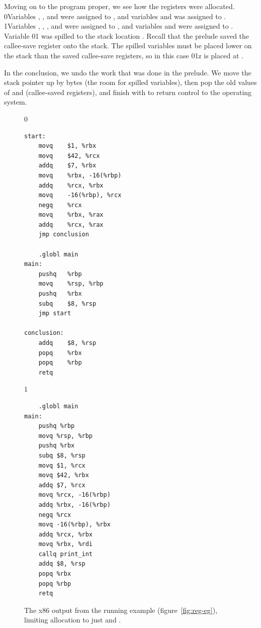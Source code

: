 \documentclass[7x10]{TimesAPriori_MIT}%
\def\racketEd{0}
\def\pythonEd{1}
\def\edition{1}
\newcommand{\racket}[1]{{\if\edition\racketEd{#1}\fi}}
\newcommand{\pythonColor}[0]{}
\newcommand{\python}[1]{{\if\edition\pythonEd\pythonColor #1\fi}}
\numberwithin{theorem}{chapter}
\numberwithin{definition}{chapter}
\numberwithin{equation}{chapter}
\begin{document}
Moving on to the program proper, we see how the registers were
allocated.
%
\racket{Variables , , and  were assigned to
  \code{rbx}, and variables  and \code{t} was assigned to .}
%
\python{Variables , , , and \code{tmp\_0}
  were assigned to \code{rcx}, and variables \code{w} and \code{tmp\_1}
  were assigned to \code{rbx}.}
%
Variable \racket{}\python{} was spilled to the stack
location .  Recall that the prelude saved the
callee-save register  onto the stack. The spilled variables
must be placed lower on the stack than the saved callee-save
registers, so in this case \racket{}\python{z} is placed at
.

In the conclusion, we undo the work that was
done in the prelude. We move the stack pointer up by  bytes
(the room for spilled variables), then pop the old values of
 and  (callee-saved registers), and finish with
 to return control to the operating system.

  
\begin{figure}[tbp]
\begin{minipage}{0.55\textwidth}
\begin{tcolorbox}[colback=white]
{\if\edition\racketEd
\begin{lstlisting}
start:
	movq	$1, %rbx
	movq	$42, %rcx
	addq	$7, %rbx
	movq	%rbx, -16(%rbp)
	addq	%rcx, %rbx
	movq	-16(%rbp), %rcx
	negq	%rcx
	movq	%rbx, %rax
	addq	%rcx, %rax
	jmp conclusion

	.globl main
main:
	pushq	%rbp
	movq	%rsp, %rbp
	pushq	%rbx
	subq	$8, %rsp
	jmp start
        
conclusion:
	addq	$8, %rsp
	popq	%rbx
	popq	%rbp
	retq
\end{lstlisting}
\fi}
{\if\edition\pythonEd\pythonColor
\begin{lstlisting}
	.globl main
main:
	pushq %rbp
	movq %rsp, %rbp
	pushq %rbx
	subq $8, %rsp
	movq $1, %rcx
	movq $42, %rbx
	addq $7, %rcx
	movq %rcx, -16(%rbp)
	addq %rbx, -16(%rbp)
	negq %rcx
	movq -16(%rbp), %rbx
	addq %rcx, %rbx
	movq %rbx, %rdi
	callq print_int
	addq $8, %rsp
	popq %rbx
	popq %rbp
	retq
\end{lstlisting}
\fi}
\end{tcolorbox}
\end{minipage}
\caption{The x86 output from the running example
  (figure~\ref{fig:reg-eg}), limiting allocation to just 
  and .}
\label{fig:running-example-x86}
\end{figure}
\end{document}
